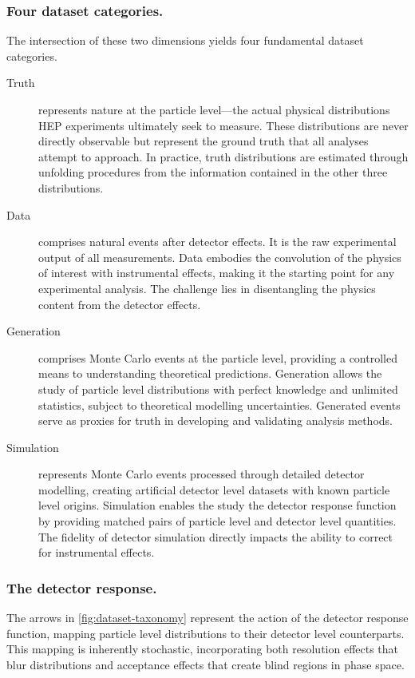 \begin{definition}
    \subsubsection{Four dataset categories.}
        The intersection of these two dimensions yields four fundamental dataset categories.
        \begin{description}
            \item[Truth]  represents nature at the particle level---the actual physical distributions HEP experiments ultimately seek to measure.
            These distributions are never directly observable but represent the ground truth that all analyses attempt to approach.
            In practice, truth distributions are estimated through unfolding procedures from the information contained in the other three distributions.
            \item [Data] comprises natural events after detector effects.
            It is the raw experimental output of all measurements.
            Data embodies the convolution of the physics of interest with instrumental effects, making it the starting point for any experimental analysis.
            The challenge lies in disentangling the physics content from the detector effects.
            \item [Generation] comprises Monte Carlo events at the particle level, providing a controlled means to understanding theoretical predictions.
            Generation allows the study of particle level distributions with perfect knowledge and unlimited statistics, subject to theoretical modelling uncertainties.
            Generated events serve as proxies for truth in developing and validating analysis methods.
            \item [Simulation] represents Monte Carlo events processed through detailed detector modelling, creating artificial detector level datasets with known particle level origins.
            Simulation enables the study the detector response function by providing matched pairs of particle level and detector level quantities.
            The fidelity of detector simulation directly impacts the ability to correct for instrumental effects.
        \end{description}
    \subsubsection{The detector response.}
        The arrows in \cref{fig:dataset-taxonomy} represent the action of the detector response function, mapping particle level distributions to their detector level counterparts.
        This mapping is inherently stochastic, incorporating both resolution effects that blur distributions and acceptance effects that create blind regions in phase space.


\end{definition}
